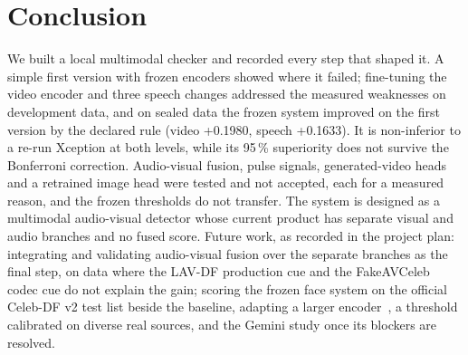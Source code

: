 \documentclass[conference,a4paper]{IEEEtran_nodash}
\begin{document}
\section{Conclusion}\label{sec:concl}
We built a local multimodal checker and recorded every step that shaped it. A
simple first version with frozen encoders showed where it failed; fine-tuning the
video encoder and three speech changes addressed the measured weaknesses on
development data, and on sealed data the frozen system improved on the first
version by the declared rule (video +0.1980, speech +0.1633). It is non-inferior
to a re-run Xception at both levels, while its 95\,\% superiority does not survive
the Bonferroni correction. Audio-visual fusion, pulse signals, generated-video
heads and a retrained image head were tested and not accepted, each for a measured
reason, and the frozen thresholds do not transfer. The system is designed as a
multimodal audio-visual detector whose current product has separate visual and audio
branches and no fused score. Future work, as recorded in the project plan: integrating
and validating audio-visual fusion over the separate branches as the final step, on
data where the LAV-DF production cue and the FakeAVCeleb codec cue do not explain the
gain; scoring the frozen face system on the official Celeb-DF v2 test list
beside the baseline, adapting a larger encoder~\cite{hu2022lora}, a threshold
calibrated on diverse real sources, and the Gemini study once its blockers are
resolved.

\newpage
\end{document}
